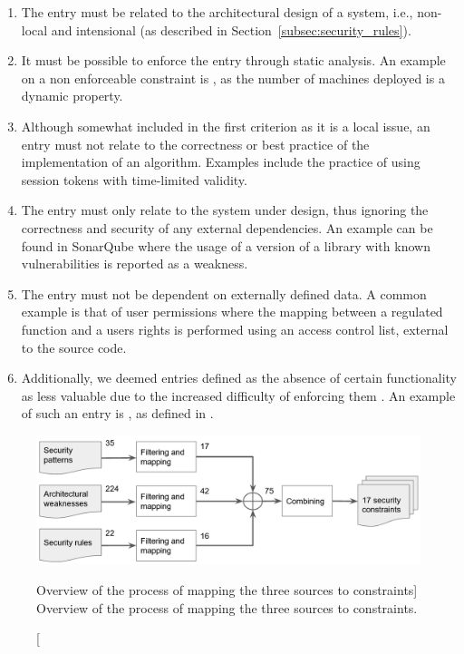 \begin{enumerate}
    \item The entry must be related to the architectural design of a system, i.e., non-local and intensional (as described in Section~\ref{subsec:security_rules}). \label{criterion_1}
    \item It must be possible to enforce the entry through static analysis. An example on a non enforceable constraint is  \cite{franch_constraining_2019}, as the number of machines deployed is a dynamic property. \label{criterion_2}
    \item Although somewhat included in the first criterion as it is a local issue, an entry must not relate to the correctness or best practice of the implementation of an algorithm. Examples include the practice of using session tokens with time-limited validity. \label{criterion_3}
    \item The entry must only relate to the system under design, thus ignoring the correctness and security of any external dependencies. An example can be found in SonarQube where the usage of a version of a library with known vulnerabilities is reported as a weakness. \label{criterion_4}
    \item The entry must not be dependent on externally defined data. A common example is that of user permissions where the mapping between a regulated function and a users rights is performed using an access control list, external to the source code. \label{criterion_5}
    \item Additionally, we deemed entries defined as the absence of certain functionality as less valuable due to the increased difficulty of enforcing them \cite{haley_security_2008}. An example of such an entry is , as defined in \cite{franch_constraining_2019}.
\end{enumerate}

\begin{figure}
    \centering
    \includegraphics[width=\textwidth]{figure/SelectionProcess.png}
    \caption
        [Overview of the process of mapping the three sources to constraints]
        {Overview of the process of mapping the three sources to constraints.}
    \label{fig:mapping_process}
\end{figure}

